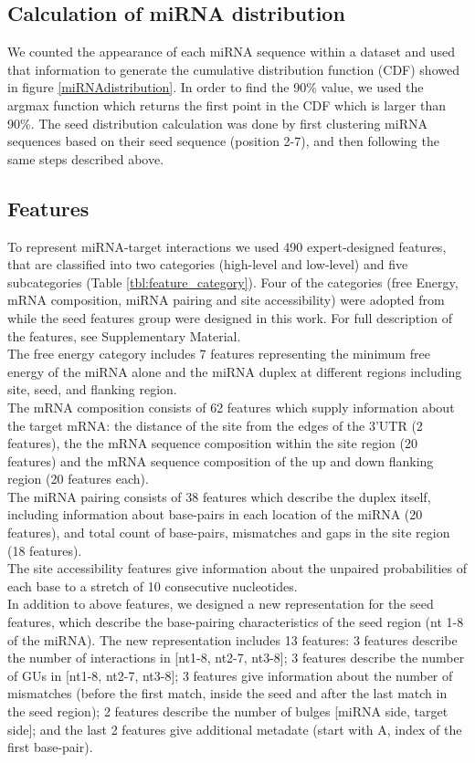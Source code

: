 \documentclass{bmcart}
\begin{document}
\subsection*{Calculation of miRNA distribution} \label{miRNAdistribution}
We counted the appearance of each miRNA sequence within a dataset and used that information to generate the cumulative distribution function (CDF) showed in figure \ref{miRNAdistribution}. In order to find the 90\% value, we used the argmax function which returns the first point in the CDF which is larger than 90\%.
The seed distribution calculation was done by first clustering miRNA sequences based on their seed sequence (position 2-7), and then following the same steps described above.

\subsection*{Features} \label{methods_features}
To represent miRNA-target interactions we used 490 expert-designed features, that are classified into two categories (high-level and low-level) and five subcategories (Table \ref{tbl:feature_category}). Four of the categories (free Energy, mRNA composition, miRNA pairing and site accessibility) were adopted from \cite{wen2018deepmirtar} while the seed features group were designed in this work. For full description of the features, see Supplementary Material.  
\\ The free energy category includes 7 features representing the minimum free energy of the miRNA alone and the miRNA duplex at different regions including site, seed, and flanking region. 
\\ The mRNA composition consists of 62 features which supply information about the target mRNA: the distance of the site from the edges of the 3'UTR (2 features), the the mRNA sequence composition within the site region (20 features) and the mRNA sequence composition of the up and down flanking region (20 features each). 
\\ The miRNA pairing consists of 38 features which describe the duplex itself, including information about base-pairs in each location of the miRNA (20 features), and total count of base-pairs, mismatches and gaps in the site region (18 features).
\\ The site accessibility features give information about the unpaired probabilities of each base to a stretch of 10 consecutive nucleotides. 
\\ In addition to above features, we designed a new representation for the seed features, which describe the base-pairing characteristics of the seed region (nt 1-8 of the miRNA). The new representation includes 13 features: 3 features describe the number of interactions in [nt1-8, nt2-7, nt3-8]; 3 features describe the number of GUs in [nt1-8, nt2-7, nt3-8]; 3 features give information about the number of mismatches (before the first match, inside the seed and after the last match in the seed region); 2 features describe the number of bulges [miRNA side, target side]; and  the last 2 features give additional metadate (start with A, index of the first base-pair).
\end{document}
